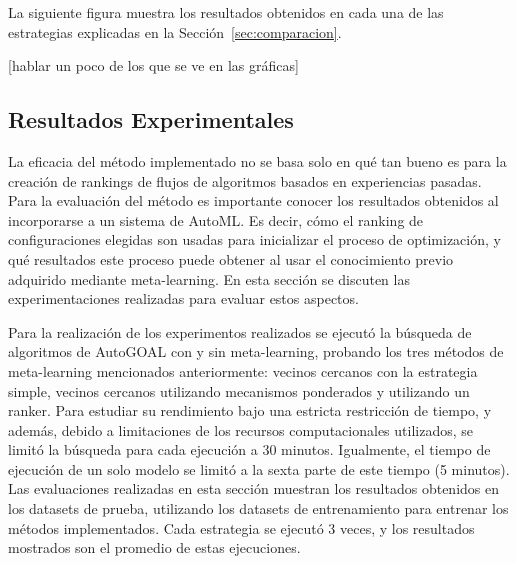 La siguiente figura muestra los resultados obtenidos en cada una de las estrategias explicadas en la Sección~\ref{sec:comparacion}.

[hablar un poco de los que se ve en las gráficas]



\subsection{Resultados Experimentales}\label{subsec:resultados}

%
%

La eficacia del método implementado no se basa solo en qué tan bueno es para la creación de rankings  de flujos de algoritmos basados en experiencias pasadas. Para la evaluación del método es importante conocer los resultados obtenidos al incorporarse a un sistema de AutoML. Es decir, cómo el ranking de configuraciones elegidas son usadas para inicializar el proceso de optimización, y qué resultados este proceso puede obtener al usar el conocimiento previo adquirido mediante meta-learning. En esta sección se discuten las experimentaciones realizadas para evaluar estos aspectos.

Para la realización de los experimentos realizados se ejecutó la búsqueda de algoritmos de AutoGOAL con y sin meta-learning, probando los tres métodos de meta-learning mencionados anteriormente: vecinos cercanos con la estrategia simple, vecinos cercanos utilizando mecanismos ponderados y utilizando un ranker. Para estudiar su rendimiento bajo una estricta restricción de tiempo, y además, debido a limitaciones de los recursos computacionales utilizados, se limitó la búsqueda para cada ejecución a 30 minutos. Igualmente, el tiempo de ejecución de un solo modelo se limitó a la sexta parte de este tiempo (5 minutos). Las evaluaciones realizadas en esta sección muestran los resultados obtenidos en los datasets de prueba, utilizando los datasets de entrenamiento para entrenar los métodos implementados. Cada estrategia se ejecutó 3 veces, y los resultados mostrados son el promedio de estas ejecuciones. 

